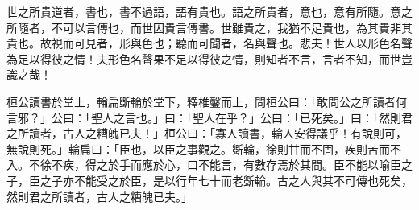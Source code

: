 \begin{pinyinscope}
世之所貴道者，書也，書不過語，語有貴也。語之所貴者，意也，意有所隨。意之所隨者，不可以言傳也，而世因貴言傳書。世雖貴之，我猶不足貴也，為其貴非其貴也。故視而可見者，形與色也；聽而可聞者，名與聲也。悲夫！世人以形色名聲為足以得彼之情！夫形色名聲果不足以得彼之情，則知者不言，言者不知，而世豈識之哉！

桓公讀書於堂上，輪扁斲輪於堂下，釋椎鑿而上，問桓公曰：「敢問公之所讀者何言邪？」公曰：「聖人之言也。」曰：「聖人在乎？」公曰：「已死矣。」曰：「然則君之所讀者，古人之糟魄已夫！」桓公曰：「寡人讀書，輪人安得議乎！有說則可，無說則死。」輪扁曰：「臣也，以臣之事觀之。斲輪，徐則甘而不固，疾則苦而不入。不徐不疾，得之於手而應於心，口不能言，有數存焉於其間。臣不能以喻臣之子，臣之子亦不能受之於臣，是以行年七十而老斲輪。古之人與其不可傳也死矣，然則君之所讀者，古人之糟魄已夫。」


\end{pinyinscope}